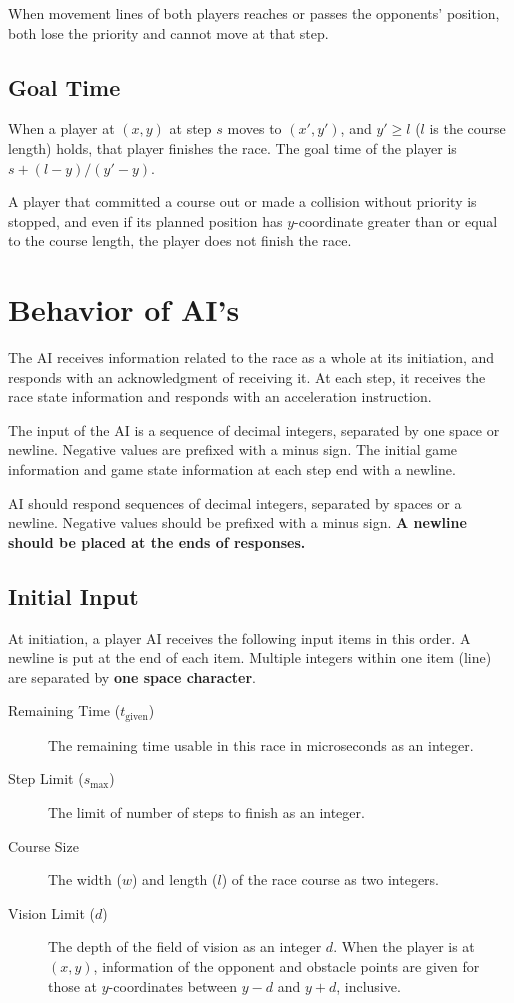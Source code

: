 \documentclass[11pt]{article}
\begin{document}
When movement lines of both players reaches or passes the opponents'
position, both lose the priority and cannot move at that step.

\subsection{Goal Time}
When a player at $(x, y)$ at step $s$ moves to $(x', y')$, and $y'\ge
l$ ($l$ is the course length) holds, that player finishes the race.
The goal time of the player is $s + (l-y)/(y'-y).$

A player that committed a course out or made a collision without
priority is stopped, and even if its planned position has
$y$-coordinate greater than or equal to the course length, the player
does not finish the race.

\section{Behavior of AI's}

The AI receives information related to the race as a whole at its
initiation, and responds with an acknowledgment of receiving it.  At
each step, it receives the race state information and responds with an
acceleration instruction.

The input of the AI is a sequence of decimal integers, separated by
one space or newline.  Negative values are prefixed with a minus
sign.  The initial game information and game state information at each
step end with a newline.

AI should respond sequences of decimal integers, separated by
spaces or a newline.  Negative values should be prefixed with a minus
sign.  {\bf A newline should be placed at the ends of responses.}

\subsection{Initial Input}
At initiation, a player AI receives the following input items in this order.
A newline is put at the end of each item. Multiple integers within one item (line) are separated by {\bf one space character}.
\begin{description}
\item[Remaining Time ($t_\mathrm{given}$)] The remaining time usable in this race in
  microseconds as an integer.
\item[Step Limit ($s_\mathrm{max}$)] The limit of number of steps to finish as an integer.
\item[Course Size] The width ($w$) and length ($l$) of the race course as two integers.
\item[Vision Limit ($d$)] The depth of the field of vision as an integer
  $d$. When the player is at $(x, y)$, information of the opponent and
  obstacle points are given for those at $y$-coordinates between $y-d$
  and $y+d$, inclusive.
\end{description}
\end{document}
